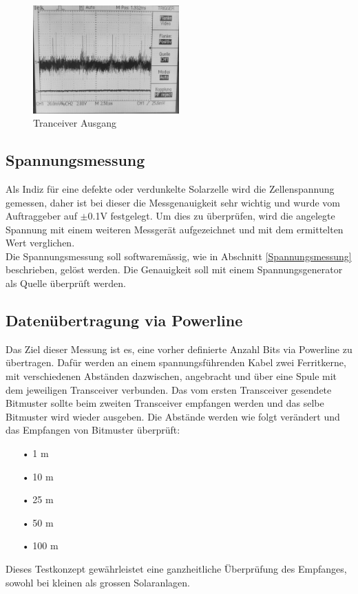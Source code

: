 \begin{figure}[htb]
\centering
\includegraphics[width=0.5\textwidth]{sections/data/singalbilder4.jpg}
\caption{Tranceiver Ausgang}
\label{Trans_Aus}
\end{figure}


\subsection{Spannungsmessung}
Als Indiz für eine defekte oder verdunkelte Solarzelle wird die Zellenspannung gemessen, daher ist bei dieser die Messgenauigkeit sehr wichtig und wurde vom Auftraggeber auf $\pm$0.1V festgelegt. Um dies zu überprüfen, wird die angelegte Spannung mit einem weiteren Messgerät aufgezeichnet und mit dem ermittelten Wert verglichen. \\
Die Spannungsmessung soll softwaremässig, wie in Abschnitt \ref{Spannungsmessung} beschrieben, gelöst werden. Die Genauigkeit soll mit einem Spannungsgenerator als Quelle überprüft werden. 
\subsection{Datenübertragung via Powerline}
Das Ziel dieser Messung ist es, eine vorher definierte Anzahl Bits via Powerline zu übertragen. Dafür werden an einem spannungsführenden Kabel zwei Ferritkerne, mit verschiedenen Abständen dazwischen, angebracht und über eine Spule mit dem jeweiligen Transceiver verbunden. Das vom ersten Transceiver gesendete Bitmuster sollte beim zweiten Transceiver empfangen werden und das selbe Bitmuster wird wieder ausgeben.
Die Abstände werden wie folgt verändert und das Empfangen von Bitmuster überprüft:
\begin{enumerate}
\item[•]1 m
\item[•]10 m
\item[•]25 m
\item[•]50 m
\item[•]100 m
\end{enumerate}
Dieses Testkonzept gewährleistet eine ganzheitliche Überprüfung des Empfanges, sowohl bei kleinen als grossen Solaranlagen.
